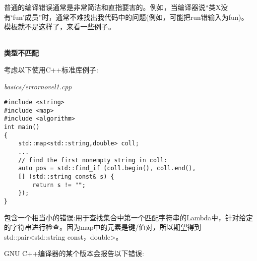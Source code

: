 普通的编译错误通常是非常简洁和直指要害的。例如，当编译器说“类X没有‘fun’成员”时，通常不难找出我代码中的问题(例如，可能把run错输入为fun)。模板就不是这样了，来看一些例子。

\hspace*{\fill} \\ %
\noindent
\textbf{类型不匹配}

考虑以下使用C++标准库例子:

\noindent
\textit{basics/errornovel1.cpp}
\begin{lstlisting}[style=styleCXX]
#include <string>
#include <map>
#include <algorithm>
int main()
{
	std::map<std::string,double> coll;
	...
	// find the first nonempty string in coll:
	auto pos = std::find_if (coll.begin(), coll.end(),
	[] (std::string const& s) {
		return s != "";
	});
}
\end{lstlisting}

包含一个相当小的错误:用于查找集合中第一个匹配字符串的Lambda中，针对给定的字符串进行检查。因为map中的元素是键/值对，所以期望得到std::pair<std::string const，double>。

GNU C++编译器的某个版本会报告以下错误:

